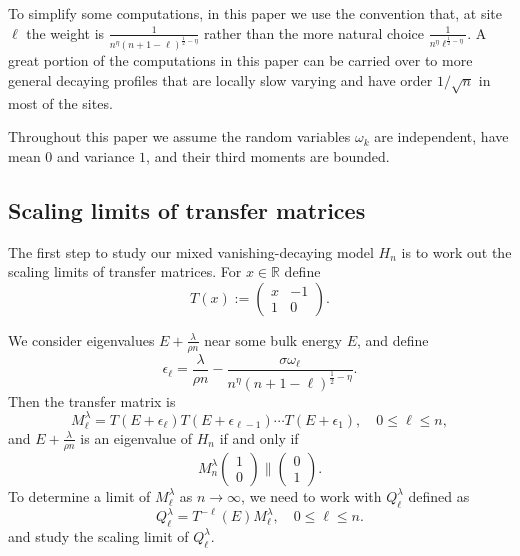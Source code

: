 \documentclass[12pt, reqno]{amsart}
\theoremstyle{definition}
\theoremstyle{remark}
\numberwithin{equation}{section}
\begin{document}
To simplify some computations, in this paper we use the convention that, at site $\ell$ the weight is $\frac{1}{n^\eta(n+1-\ell)^{\frac{1}{2}-\eta}}$ rather than the more natural choice $\frac{1}{n^\eta \ell^{\frac{1}{2}-\eta}}$. A great portion of the computations in this paper can be carried over to more general decaying profiles that are locally slow varying and have order $1/{\sqrt{n}}$ in most of the sites.

Throughout this paper we assume the random variables $\omega_k$ are independent, have mean $0$ and variance $1$, and their third moments are bounded.



\subsection{Scaling limits of transfer matrices}
The first step to study our mixed vanishing-decaying model $H_n$ is to work out the scaling limits of transfer matrices. For $x\in\mathbb{R}$ define
$$T(x):=\begin{pmatrix}x&-1\\1&0\end{pmatrix}.$$

We consider eigenvalues $E+\frac{\lambda}{\rho n}$ near some bulk energy $E$, and define 
\begin{equation}\label{variableis}
\epsilon_\ell=\frac{\lambda}{\rho n}-\frac{\sigma\omega_\ell}{n^\eta (n+1-\ell)^{\frac{1}{2}-\eta}}.\end{equation}
Then the transfer matrix is 
\begin{equation}\label{transferis}
M_\ell^\lambda=T(E+\epsilon_\ell)T(E+\epsilon_{\ell-1})\cdots T(E+\epsilon_1),\quad 0\leq \ell\leq n,
\end{equation}
and $E+\frac{\lambda}{\rho n}$ is an eigenvalue of $H_n$ if and only if 
$$M_n^\lambda\begin{pmatrix} 1\\0\end{pmatrix}\parallel \begin{pmatrix}0\\1\end{pmatrix}.$$
To determine a limit of $M_\ell^\lambda$ as $n\to\infty$, we need to work with $Q_\ell^\lambda$ defined as
\begin{equation}\label{307rescaling}
Q_\ell^\lambda=T^{-\ell}(E)M_\ell^\lambda,\quad 0\leq\ell\leq n.\end{equation}
and study the scaling limit of $Q_\ell^\lambda$. 
\end{document}
